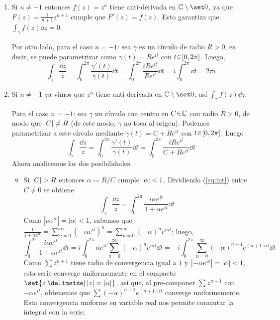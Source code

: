\begin{sol}
\begin{enumerate}[label=(\alph*), leftmargin=1.8em]
\item 
Si $n \neq -1$ entonces $f(z) = z^n$ tiene anti-derivada en $\mathbb{C}\setminus\set0$, ya que $F(z) = \frac{1}{n+1}z^{n+1}$ cumple que $F'(z) = f(z)$. Esto garantiza que $\int_\gamma f(z) \dd{z} = 0$.\par
Por otro lado, para el caso $n=-1$: sea $\gamma$ es un círculo de radio $R>0$, es decir, se puede parametrizar como $\gamma(t) = Re^{it}$ con $t\en[0,2\pi]$. Luego,
\[
\int_\gamma \frac{\dd{z}}{z}  
= \int^{2\pi}_0 \frac{\gamma'(t)}{\gamma(t)} \dd{t} 
= \int^{2\pi}_0 \frac{iRe^{it}}{Re^{it}} \dd{t} 
= i\int^{2\pi}_0 \dd{t} = 2\pi i
\]
\item 
Si $n \neq -1$ ya vimos que $z^n$ tiene anti-derivada en $\mathbb{C}\setminus\set0$, así $\int_\gamma f(z) \dd{z}$.\par
Para el caso $n=-1$: sea $\gamma$ un círculo con centro en $C\en\mathbb{C}$ con radio $R > 0$, de modo que $\abs{C} \neq R$ (de este modo, $\gamma$ no toca al origen). Podemos parametrizar a este círculo mediante $\gamma(t) = C + Re^{it}$ con $t\en[0,2\pi]$. Luego
\begin{equation}\label{eq:int}
\int_\gamma \frac{\dd{z}}{z}
= \int^{2\pi}_0 \frac{\gamma'(t)}{\gamma(t)} \dd{t}
= \int^{2\pi}_0 \frac{iRe^{it}}{C+Re^{it}} \dd{t}
\end{equation}
Ahora analicemos las dos posibilidades:
\begin{itemize}[leftmargin=1em]
    \item Si $\abs{C} > R$ entonces $\alpha \coloneq R/C$ cumple $\abs{\alpha} < 1$. Dividiendo (\ref{eq:int}) entre $C \neq 0$ se obtiene
    \[
    \int_\gamma \frac{\dd{z}}{z}
    = \int^{2\pi}_0 \frac{i\alpha e^{it}}{1+\alpha e^{it}} \dd{t}
    \]
    Como $|\alpha e^{it}| = |\alpha| < 1$, sabemos que $\frac{1}{1+\alpha e^{it}} = \sum^\infty_{n=0} (-\alpha e^{it})^n = \sum^\infty_{n=0}(-\alpha)^n e^{nit}$; luego,
    \[
    \int^{2\pi}_0 \frac{i\alpha e^{it}}{1+\alpha e^{it}} \dd{t}
    = i\int^{2\pi}_0 \alpha e^{it}\sum^{\infty}_{n=0}(-\alpha)^n e^{nit} \dd{t}
    = -i\int^{2\pi}_0 \sum^{\infty}_{n=0}(-\alpha)^{n+1} e^{(n+1)it} \dd{t}
    \]
    Como $\sum z^{n+1}$ tiene radio de convergencia igual a $1$ y $\abs{-\alpha e^{it}} = \abs{\alpha} < 1$, esta serie converge uniformemente en el compacto $\set{z \given |z| = |\alpha|}$, así que, al pre-componer $\sum z^{n+1}$ con $-\alpha e^{it}$, obtenemos que $\sum (-\alpha)^{n+1}e^{(n+1)it}$ converge uniformemente. Esta convergencia uniforme en variable real nos permite conmutar la integral con la serie:

\end{itemize}
\end{enumerate}
\end{sol}
